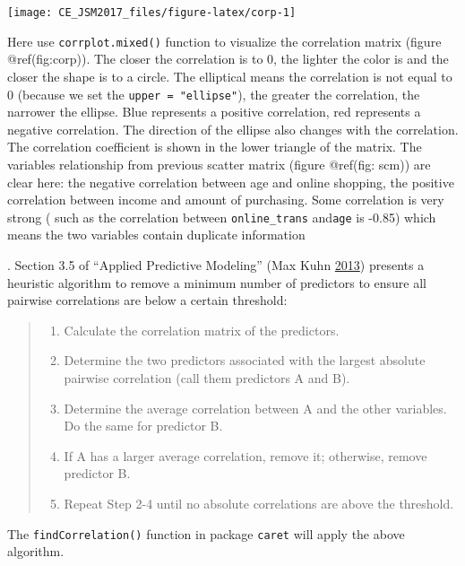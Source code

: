\documentclass[
]{article}
\providecommand{\tightlist}{%
  \setlength{\itemsep}{0pt}\setlength{\parskip}{0pt}}
\begin{document}
\begin{center}\texttt{[image: CE\_JSM2017\_files/figure-latex/corp-1]} \end{center}

Here use \texttt{corrplot.mixed()} function to visualize the correlation
matrix (figure @ref(fig:corp)). The closer the correlation is to 0, the
lighter the color is and the closer the shape is to a circle. The
elliptical means the correlation is not equal to 0 (because we set the
\texttt{upper\ =\ "ellipse"}), the greater the correlation, the narrower
the ellipse. Blue represents a positive correlation, red represents a
negative correlation. The direction of the ellipse also changes with the
correlation. The correlation coefficient is shown in the lower triangle
of the matrix. The variables relationship from previous scatter matrix
(figure @ref(fig: scm)) are clear here: the negative correlation between
age and online shopping, the positive correlation between income and
amount of purchasing. Some correlation is very strong ( such as the
correlation between \texttt{online\_trans} and\texttt{age} is -0.85)
which means the two variables contain duplicate information

. Section 3.5 of ``Applied Predictive Modeling'' (Max Kuhn
\protect\hyperlink{ref-APM}{2013}) presents a heuristic algorithm to
remove a minimum number of predictors to ensure all pairwise
correlations are below a certain threshold:

\begin{quote}
\begin{enumerate}
\def\labelenumi{(\arabic{enumi})}
\tightlist
\item
  Calculate the correlation matrix of the predictors.
\item
  Determine the two predictors associated with the largest absolute
  pairwise correlation (call them predictors A and B).
\item
  Determine the average correlation between A and the other variables.
  Do the same for predictor B.
\item
  If A has a larger average correlation, remove it; otherwise, remove
  predictor B.
\item
  Repeat Step 2-4 until no absolute correlations are above the
  threshold.
\end{enumerate}
\end{quote}

The \texttt{findCorrelation()} function in package \texttt{caret} will
apply the above algorithm.
\end{document}
